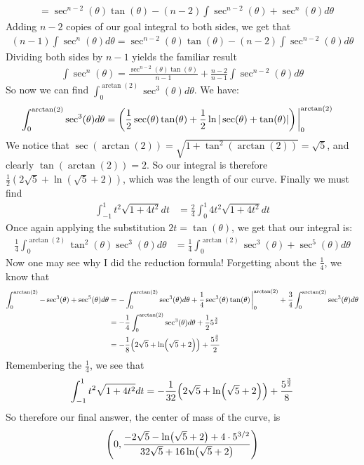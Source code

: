 \documentclass[12pt]{article}
\theoremstyle{definition}
\theoremstyle{remark}
\begin{document}
\begin{enumerate}[leftmargin=\labelsep]
\begin{align*}
			&= \sec^{n-2}(\theta)\tan(\theta) - (n-2)\int \sec^{n-2}(\theta)+\sec^n(\theta)d\theta
		\end{align*}
		Adding $n-2$ copies of our goal integral to both sides, we get that
		\begin{align*}
			(n-1)\int \sec^n(\theta)d\theta = \sec^{n-2}(\theta)\tan(\theta) - (n-2)\int \sec^{n-2}(\theta)d\theta
		\end{align*}
		Dividing both sides by $n-1$ yields the familiar result
		\begin{align*}
			\int \sec^n(\theta) = \frac{\sec^{n-2}(\theta)\tan(\theta)}{n-1} + \frac{n-2}{n-1}\int \sec^{n-2}(\theta)d\theta
		\end{align*}
		So now we can find $\int_0^{\arctan(2)} \sec^3(\theta)d\theta$.
		We have:
		\begin{align*}
			\int_0^{\arctan(2)} \sec^3(\theta)d\theta &= \qty(\frac12 \sec(\theta)\tan(\theta) + \frac12 \ln|\sec(\theta)+\tan(\theta)|)\eval_0^{\arctan(2)}
		\end{align*}
		We notice that $\sec(\arctan(2)) = \sqrt{1+\tan^2(\arctan(2))} = \sqrt{5}$, and clearly $\tan(\arctan(2)) = 2$. So our integral is therefore $\frac12 (2\sqrt{5}+\ln(\sqrt{5}+2))$, which was the length of our curve. Finally we must find 
		\begin{align*}
			\int_{-1}^1 t^2\sqrt{1+4t^2}dt &= \frac24\int_0^1 4t^2\sqrt{1+4t^2}dt
		\end{align*}
		Once again applying the substitution $2t = \tan(\theta)$, we get that our integral is:
		\begin{align*}
			\frac14 \int_0^{\arctan(2)} \tan^2(\theta)\sec^3(\theta)d\theta &= \frac14 \int_0^{\arctan(2)} \sec^3(\theta) + \sec^5(\theta)d\theta
		\end{align*}
		Now one may see why I did the reduction formula! Forgetting about the $\frac14$, we know that
		\begin{align*}
			\int_0^{\arctan(2)} -\sec^3(\theta) + \sec^5(\theta)d\theta &= -\int_0^{\arctan(2)} \sec^3(\theta)d\theta + \frac14 \sec^3(\theta)\tan(\theta)\eval_0^{\arctan(2)} + \frac34 \int_0^{\arctan(2)} \sec^3(\theta)d\theta \\
			&= -\frac14 \int_0^{\arctan(2)} \sec^3(\theta)d\theta + \frac12 5^{\frac32} \\
			&= -\frac18 \qty(2\sqrt{5}+\ln(\sqrt{5}+2)) + \frac{5^\frac32}{2}
		\end{align*}
		Remembering the $\frac14$, we see that 
		\begin{align*}
			\int_{-1}^1 t^2\sqrt{1+4t^2}dt = -\frac1{32} \qty(2\sqrt{5}+\ln(\sqrt{5}+2)) + \frac{5^\frac32}{8}
		\end{align*}
		So therefore our final answer, the center of mass of the curve, is
		\begin{align*}
			\qty(0, \frac{-2\sqrt{5}-\ln(\sqrt{5}+2)+4 \cdot 5^{3/2}}{32\sqrt{5}+16\ln(\sqrt{5}+2)})
		\end{align*}
	

\end{enumerate}
\end{document}
